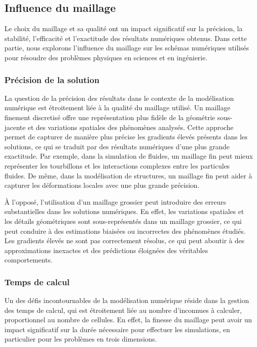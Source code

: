 \subsection{Influence du maillage}

Le choix du maillage et sa qualité ont un impact significatif sur la précision, la stabilité, l'efficacité et l'exactitude des résultats numériques obtenus. Dans cette partie, nous explorons l'influence du maillage sur les schémas numériques utilisés pour résoudre des problèmes physiques en sciences et en ingénierie.

\subsubsection{Précision de la solution}

La question de la précision des résultats dans le contexte de la modélisation numérique est étroitement liée à la qualité du maillage utilisé. Un maillage finement discretisé offre une représentation plus fidèle de la géométrie sous-jacente et des variations spatiales des phénomènes analysés. Cette approche permet de capturer de manière plus précise les gradients élevés présents dans les solutions, ce qui se traduit par des résultats numériques d'une plus grande exactitude. Par exemple, dans la simulation de fluides, un maillage fin peut mieux représenter les tourbillons et les interactions complexes entre les particules fluides. De même, dans la modélisation de structures, un maillage fin peut aider à capturer les déformations locales avec une plus grande précision.

À l'opposé, l'utilisation d'un maillage grossier peut introduire des erreurs substantielles dans les solutions numériques. En effet, les variations spatiales et les détails géométriques sont sous-représentés dans un maillage grossier, ce qui peut conduire à des estimations biaisées ou incorrectes des phénomènes étudiés. Les gradients élevés ne sont pas correctement résolus, ce qui peut aboutir à des approximations inexactes et des prédictions éloignées des véritables comportements.


\subsubsection{Temps de calcul}

Un des défis incontournables de la modélisation numérique réside dans la gestion des temps de calcul, qui est étroitement liée au nombre d'inconnues à calculer, proportionnel au nombre de cellules. En effet, la finesse du maillage peut avoir un impact significatif sur la durée nécessaire pour effectuer les simulations, en particulier pour les problèmes en trois dimensions.

